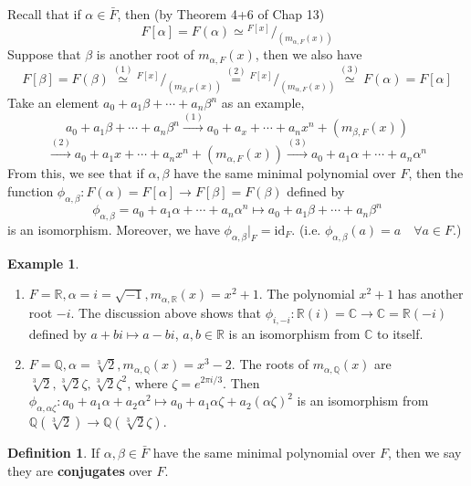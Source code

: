\documentclass{article}
\theoremstyle{definition}
\newtheorem{ex}{Example}
\newtheorem{dfn}{Definition}
\newcommand*\quot[2]{{^{\textstyle #1}\big/_{\textstyle #2}}}
\begin{document}
Recall that if $\alpha \in \bar{F}$, then (by Theorem 4+6 of Chap 13)
\[
	F[\alpha] = F(\alpha) \simeq \quot{F[x]}{(m_{\alpha, F}(x))}
\]
Suppose that $\beta$ is another root of $m_{\alpha, F}(x)$, then we also have
\[
	F[\beta] = F(\beta) \stackrel{(1)}{\simeq} \quot{F[x]}{(m_{\beta, F}(x))} \stackrel{(2)}{=} \quot{F[x]}{(m_{\alpha, F}(x))} \stackrel{(3)}{\simeq} F(\alpha) = F[\alpha]
\]
Take an element $a_0 + a_1\beta + \cdots + a_n \beta^n$ as an example,
\[
	a_0 + a_1 \beta + \cdots + a_n \beta^n \stackrel{(1)}{\to} a_0 + a_x + \cdots + a_n x^n + (m_{\beta, F}(x))
\]
\[
	\stackrel{(2)}{\to} a_0 + a_1 x + \cdots + a_n x^n + (m_{\alpha, F}(x)) \stackrel{(3)}{\to} a_0 + a_1 \alpha + \cdots + a_n \alpha^n
\]
From this, we see that if $\alpha, \beta$ have the same minimal polynomial over $F$, then the function $\phi_{\alpha, \beta}:F(\alpha) = F[\alpha] \to F[\beta] = F(\beta)$ defined by 
\[
	\phi_{\alpha, \beta} = a_0 + a_1 \alpha + \cdots + a_n \alpha^n \mapsto a_0 + a_1 \beta + \cdots + a_n \beta^n 
\]
is an isomorphism.
Moreover, we have $\phi_{\alpha, \beta}|_{F} = \text{id}_F$. (i.e. $\phi_{\alpha, \beta}(a) = a \quad \forall a \in F$.) 

\begin{ex}
	$ $\par\nobreak\ignorespaces
	\begin{enumerate}
		\item $F = \mathbb{R}, \alpha = i = \sqrt{-1}, m_{\alpha, \mathbb{R}}(x) = x^2 + 1$.
			The polynomial $x^2 + 1$ has another root $-i$.
			The discussion above shows that $\phi_{i, -i}: \mathbb{R}(i) = \mathbb{C} \to \mathbb{C} = \mathbb{R}(-i)$ defined by $a + bi \mapsto a - bi$, $a, b \in \mathbb{R}$ is an isomorphism from $\mathbb{C}$ to itself.
		
		\item $F = \mathbb{Q}, \alpha = \sqrt[3]{2}, m_{\alpha, \mathbb{Q}}(x) = x^3 - 2$.
			The roots of $m_{\alpha, \mathbb{Q}}(x)$ are $\sqrt[3]{2}, \sqrt[3]{2} \zeta, \sqrt[3]{2} \zeta^2$, where $\zeta = e^{2 \pi i/3}$. 
			Then $\phi_{\alpha, \alpha \zeta}: a_0 + a_1 \alpha + a_2 \alpha^2 \mapsto a_0 + a_1 \alpha \zeta + a_2 (\alpha \zeta)^2$ is an isomorphism from $\mathbb{Q}(\sqrt[3]{2}) \to \mathbb{Q}(\sqrt[3]{2} \zeta)$.
	\end{enumerate}
\end{ex}

\begin{dfn}
	If $\alpha, \beta \in \bar{F}$ have the same minimal polynomial over $F$, then we say they are \textbf{conjugates} over $F$.
\end{dfn}
\end{document}
